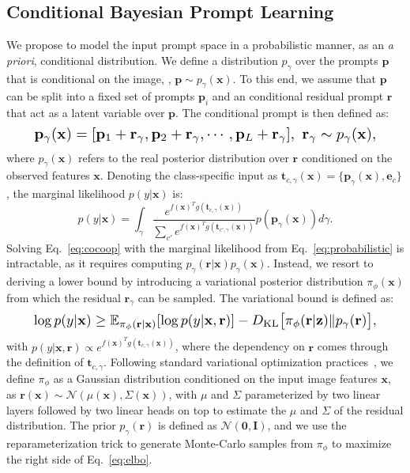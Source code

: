 \documentclass[10pt,twocolumn,letterpaper]{article}
\newcommand{\x}{\mathbf{x}}
\newcommand{\txt}{\mathbf{t}}
\newcommand{\e}{\mathbf{e}}
\newcommand{\p}{\mathbf{p}}
\def\rvr{{\mathbf{r}}}
\def\rvr{{\mathbf{r}}}
\begin{document}
\subsection{Conditional Bayesian Prompt Learning}
\label{ssec:method_conditional}

We propose to model the input prompt space in a probabilistic manner, as an \textit{a priori}, conditional distribution. We define a distribution $p_\gamma$ over the prompts $\p$ that is conditional on the image, \ie, $\p \sim p_\gamma(\x)$. To this end, we assume that $\p$ can be split into a fixed set of prompts $\p_i$ and an conditional residual prompt $\rvr$ that act as a latent variable over $\p$. The conditional prompt is then defined as:
\begin{equation}
\label{eq:new_prompt}\resizebox{.9\linewidth}{!}{$
\p_\gamma(\x) = [\p_1 + \rvr_\gamma, \p_2 + \rvr_\gamma, \cdots, \p_L + \rvr_\gamma], \, \, \rvr_\gamma \sim p_\gamma(\x),$}  \end{equation}
 where $p_\gamma(\x)$ refers to the real posterior distribution over $\rvr$ conditioned on the observed features $\x$. Denoting the class-specific input as $\txt_{c,\gamma}(\x) {=} \{\p_\gamma(\x), \e_c\}$, the marginal likelihood $p(y | \x)$ is:
\begin{equation}
     \label{eq:probabilistic}
 p(y | \x) = \int_\gamma \frac{ e^{ f(\x)^T g( \txt_{c,\gamma}(\x) )} }{ \sum_{c'} e^{ f(\x)^T g( \txt_{c',\gamma}(\x) ) } } p(\p_\gamma(\x)) d \gamma.
\end{equation}
Solving Eq.~\ref{eq:cocoop} with the marginal likelihood from Eq.~\ref{eq:probabilistic} is intractable, as it requires computing $p_\gamma(\rvr | \x) p_\gamma(\x)$. Instead, we resort to deriving a lower bound by introducing a variational posterior distribution $\pi_\phi(\x)$ from which the residual $\rvr_\gamma$ can be sampled. The variational bound is defined as:
\begin{equation}
\label{eq:elbo}
\resizebox{.9\linewidth}{!}{$\log p(y | \x) \geq \mathbb{E}_{\pi_\phi(\rvr | \x)} [\log p(y | \x, \rvr)] - D_{\mathrm{KL}}\big[\pi_{\phi}(\mathbf{r} | \mathbf{z}) \| p_{\gamma}(\mathbf{r})\big],$}
\end{equation}
with $p(y | \x, \rvr) {\propto} e^{ f(\x)^T g( \txt_{c,\gamma}(\x) )}$, where the dependency on $\rvr$ comes through the definition of $\txt_{c,\gamma}$.  Following standard variational optimization practices~\cite{kingma2013auto,gordon2018metalearning}, we define $\pi_\phi$ as a Gaussian distribution conditioned on the input image features $\x$, as $\rvr(\x) {\sim} \mathcal{N}( \mu(\x), \Sigma(\x ))$, with $\mu$ and $\Sigma$ parameterized by two linear layers followed by two linear heads on top to estimate the $\mu$ and $\Sigma$ of the residual distribution. The prior $p_\gamma(\rvr)$ is defined as $\mathcal{N}(\mathbf{0},\mathbf{I})$, and we use the reparameterization trick to generate Monte-Carlo samples from $\pi_\phi$ to maximize the right side of Eq.~\ref{eq:elbo}. 
\end{document}
